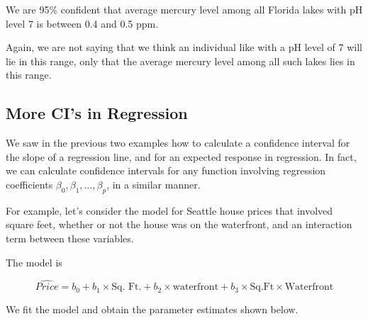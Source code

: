 \documentclass[
  letterpaper,
  DIV=11,
  numbers=noendperiod]{scrreprt}
\newenvironment{Shaded}{\begin{snugshade}}{\end{snugshade}}
\newcommand{\AttributeTok}[1]{\textcolor[rgb]{0.40,0.45,0.13}{#1}}
\newcommand{\CommentTok}[1]{\textcolor[rgb]{0.37,0.37,0.37}{#1}}
\newcommand{\DecValTok}[1]{\textcolor[rgb]{0.68,0.00,0.00}{#1}}
\newcommand{\FunctionTok}[1]{\textcolor[rgb]{0.28,0.35,0.67}{#1}}
\newcommand{\NormalTok}[1]{\textcolor[rgb]{0.00,0.23,0.31}{#1}}
\newcommand{\OtherTok}[1]{\textcolor[rgb]{0.00,0.23,0.31}{#1}}
\newcommand{\SpecialCharTok}[1]{\textcolor[rgb]{0.37,0.37,0.37}{#1}}
\begin{document}
We are 95\% confident that average mercury level among all Florida lakes
with pH level 7 is between 0.4 and 0.5 ppm.

Again, we are not saying that we think an individual like with a pH
level of 7 will lie in this range, only that the average mercury level
among all such lakes lies in this range.

\subsection{More CI's in Regression}\label{more-cis-in-regression}

We saw in the previous two examples how to calculate a confidence
interval for the slope of a regression line, and for an expected
response in regression. In fact, we can calculate confidence intervals
for any function involving regression coefficients
\(\beta_0, \beta_1, \ldots, \beta_p\), in a similar manner.

For example, let's consider the model for Seattle house prices that
involved square feet, whether or not the house was on the waterfront,
and an interaction term between these variables.

The model is

\[
\widehat{Price} = b_0 + b_1\times\text{Sq. Ft.} + b_2\times\text{waterfront} + b_3\times\text{Sq.Ft}\times\text{Waterfront}
\]

We fit the model and obtain the parameter estimates shown below.

\begin{Shaded}
\end{Shaded}
\end{document}
